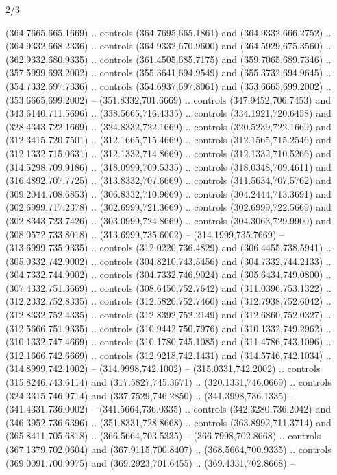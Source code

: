 \begin{flagdescription}{2/3}
\begin{scope}[xshift=0.5\flaglength,yshift=0.5\flagwidth,scale=\flagwidth/525.28]
\begin{scope}[y=0.1mm, x=0.1mm, yscale=-1,shift={(-381.5,-404)}]
\begin{scope}[shift={(5.25001,4.53053)},miter limit=4.00,line width=0.800\lw]
  (364.7665,665.1669) .. controls (364.7695,665.1861) and (364.9332,666.2752) ..
  (364.9332,668.2336) .. controls (364.9332,670.9600) and (364.5929,675.3560) ..
  (362.9332,680.9335) .. controls (361.4505,685.7175) and (359.7065,689.7346) ..
  (357.5999,693.2002) .. controls (355.3641,694.9549) and (355.3732,694.9645) ..
  (354.7332,697.7336) .. controls (354.6937,697.8061) and (353.6665,699.2002) ..
  (353.6665,699.2002) -- (351.8332,701.6669) .. controls (347.9452,706.7453) and
  (343.6140,711.5696) .. (338.5665,716.4335) .. controls (334.1921,720.6458) and
  (328.4343,722.1669) .. (324.8332,722.1669) .. controls (320.5239,722.1669) and
  (312.3415,720.7501) .. (312.1665,715.4669) .. controls (312.1565,715.2546) and
  (312.1332,715.0631) .. (312.1332,714.8669) .. controls (312.1332,710.5266) and
  (314.5298,709.9186) .. (318.0999,709.5335) .. controls (318.0348,709.4611) and
  (316.4892,707.7725) .. (313.8332,707.6669) .. controls (311.5634,707.5762) and
  (309.2044,708.6853) .. (306.8332,710.9669) .. controls (304.2444,713.3691) and
  (302.6999,717.2378) .. (302.6999,721.3669) .. controls (302.6999,722.5669) and
  (302.8343,723.7426) .. (303.0999,724.8669) .. controls (304.3063,729.9900) and
  (308.0572,733.8018) .. (313.6999,735.6002) -- (314.1999,735.7669) --
  (313.6999,735.9335) .. controls (312.0220,736.4829) and (306.4455,738.5941) ..
  (305.0332,742.9002) .. controls (304.8210,743.5456) and (304.7332,744.2133) ..
  (304.7332,744.9002) .. controls (304.7332,746.9024) and (305.6434,749.0800) ..
  (307.4332,751.3669) .. controls (308.6450,752.7642) and (311.0396,753.1322) ..
  (312.2332,752.8335) .. controls (312.5820,752.7460) and (312.7938,752.6042) ..
  (312.8332,752.4335) .. controls (312.8392,752.2149) and (312.6860,752.0327) ..
  (312.5666,751.9335) .. controls (310.9442,750.7976) and (310.1332,749.2962) ..
  (310.1332,747.4669) .. controls (310.1780,745.1085) and (311.4786,743.1096) ..
  (312.1666,742.6669) .. controls (312.9218,742.1431) and (314.5746,742.1034) ..
  (314.8999,742.1002) -- (314.9998,742.1002) -- (315.0331,742.2002) .. controls
  (315.8246,743.6114) and (317.5827,745.3671) .. (320.1331,746.0669) .. controls
  (324.3315,746.9714) and (337.7529,746.2850) .. (341.3998,736.1335) --
  (341.4331,736.0002) -- (341.5664,736.0335) .. controls (342.3280,736.2042) and
  (346.3952,736.6396) .. (351.8331,728.8668) .. controls (363.8992,711.3714) and
  (365.8411,705.6818) .. (366.5664,703.5335) -- (366.7998,702.8668) .. controls
  (367.1379,702.0604) and (367.9115,700.8407) .. (368.5664,700.9335) .. controls
  (369.0091,700.9975) and (369.2923,701.6455) .. (369.4331,702.8668) --

\end{scope}
\end{scope}
\end{scope}
\end{flagdescription}
